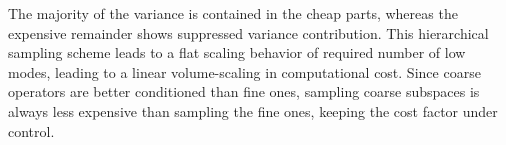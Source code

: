 The majority of the variance is contained in the cheap parts, whereas the expensive remainder shows suppressed variance contribution.
This hierarchical sampling scheme leads to a flat scaling behavior of required number of low modes, leading to a linear volume-scaling in computational cost.
Since coarse operators are better conditioned than fine ones, sampling coarse subspaces is always less expensive than sampling the fine ones, keeping the cost factor under control.

